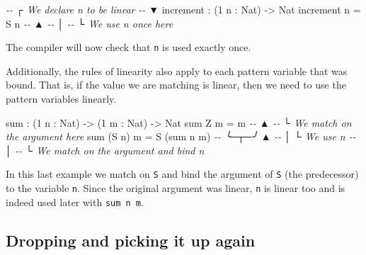 \documentclass[
]{article}
\newenvironment{Shaded}{}{}
\newcommand{\CommentTok}[1]{\textcolor[rgb]{0.38,0.63,0.69}{\textit{#1}}}
\newcommand{\DataTypeTok}[1]{\textcolor[rgb]{0.56,0.13,0.00}{#1}}
\newcommand{\DecValTok}[1]{\textcolor[rgb]{0.25,0.63,0.44}{#1}}
\newcommand{\FunctionTok}[1]{\textcolor[rgb]{0.02,0.16,0.49}{#1}}
\newcommand{\NormalTok}[1]{#1}
\newcommand{\OperatorTok}[1]{\textcolor[rgb]{0.40,0.40,0.40}{#1}}
\newcommand{\OtherTok}[1]{\textcolor[rgb]{0.00,0.44,0.13}{#1}}
\begin{document}
\begin{Shaded}
\begin{Highlighting}[]
\CommentTok{{-}{-}           ┌ We declare \textasciigrave{}n\textasciigrave{} to be linear}
\CommentTok{{-}{-}           ▼}
\NormalTok{increment }\OperatorTok{:}\NormalTok{ (}\DecValTok{1}\NormalTok{ n }\OperatorTok{:} \DataTypeTok{Nat}\NormalTok{) }\OtherTok{{-}\textgreater{}} \DataTypeTok{Nat}
\NormalTok{increment n }\OtherTok{=} \DataTypeTok{S}\NormalTok{ n}
\CommentTok{{-}{-}              ▲}
\CommentTok{{-}{-}              │}
\CommentTok{{-}{-}              └ We use n once here}
\end{Highlighting}
\end{Shaded}

The compiler will now check that \texttt{n} is used exactly once.

Additionally, the rules of linearity also apply to each pattern variable
that was bound. That is, if the value we are matching is linear, then we
need to use the pattern variables linearly.

\begin{Shaded}
\begin{Highlighting}[]
\FunctionTok{sum} \OperatorTok{:}\NormalTok{ (}\DecValTok{1}\NormalTok{ n }\OperatorTok{:} \DataTypeTok{Nat}\NormalTok{) }\OtherTok{{-}\textgreater{}}\NormalTok{ (}\DecValTok{1}\NormalTok{ m }\OperatorTok{:} \DataTypeTok{Nat}\NormalTok{) }\OtherTok{{-}\textgreater{}} \DataTypeTok{Nat}
\FunctionTok{sum} \DataTypeTok{Z}\NormalTok{ m }\OtherTok{=}\NormalTok{ m}
\CommentTok{{-}{-}  ▲}
\CommentTok{{-}{-}  └ We match on the argument here}
\FunctionTok{sum}\NormalTok{ (}\DataTypeTok{S}\NormalTok{ n) m }\OtherTok{=} \DataTypeTok{S}\NormalTok{ (}\FunctionTok{sum}\NormalTok{ n m)}
\CommentTok{{-}{-}  ╰─┬─╯            ▲}
\CommentTok{{-}{-}    │              └ We use \textasciigrave{}n\textasciigrave{}}
\CommentTok{{-}{-}    │}
\CommentTok{{-}{-}    └ We match on the argument and bind \textasciigrave{}n\textasciigrave{}}
\end{Highlighting}
\end{Shaded}

In this last example we match on \texttt{S} and bind the argument of
\texttt{S} (the predecessor) to the variable \texttt{n}. Since the
original argument was linear, \texttt{n} is linear too and is indeed
used later with \texttt{sum\ n\ m}.

\hypertarget{dropping-and-picking-it-up-again}{%
\subsection{Dropping and picking it up
again}\label{dropping-and-picking-it-up-again}}
\end{document}
